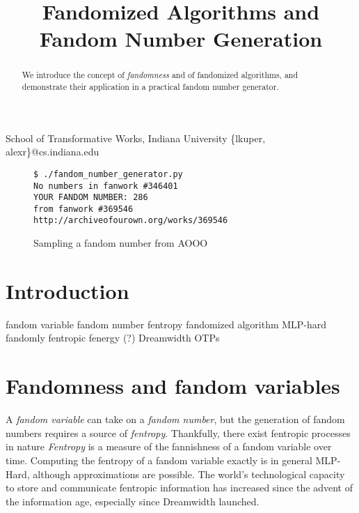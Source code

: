 \documentclass[9pt]{sigplanconf}
\begin{document}
\title{Fandomized Algorithms and Fandom Number Generation}

           {School of Transformative Works, Indiana University}
           {\{lkuper, alexr\}@cs.indiana.edu}

\maketitle

\begin{abstract}
We introduce the concept of \emph{fandomness} and of fandomized algorithms, and
demonstrate their application in a practical fandom number generator.
\end{abstract}

\begin{figure}[bl]
\begin{verbatim}
$ ./fandom_number_generator.py 
No numbers in fanwork #346401
YOUR FANDOM NUMBER: 286
from fanwork #369546
http://archiveofourown.org/works/369546
\end{verbatim}
\caption{Sampling a fandom number from AOOO}
\end{figure}

\section{Introduction}

fandom variable
fandom number
fentropy
fandomized algorithm
MLP-hard
fandomly
fentropic
fenergy (?)
Dreamwidth
OTPs

\section{Fandomness and fandom variables}
A \emph{fandom variable} can take on a \emph{fandom number}, but the generation
of fandom numbers requires a source of \emph{fentropy}. Thankfully, there exist
fentropic processes in nature \emph{Fentropy} is a measure of the fannishness
of a fandom variable over time.  Computing the fentropy of a fandom variable
exactly is in general MLP-Hard, although approximations are possible.  The
world's technological capacity to store and communicate fentropic information
has increased since the advent of the information age, especially since
Dreamwidth launched.
\end{document}
